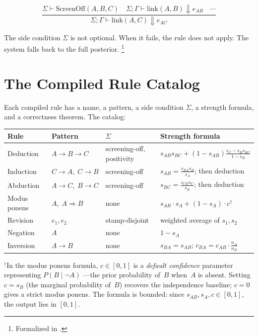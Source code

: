 \documentclass[11pt,openany]{report}
\begin{document}
\[
\frac{\Sigma \vdash \mathrm{ScreenOff}(A, B, C) \quad
      \Sigma; \Gamma \vdash \mathrm{link}(A, B) \Downarrow e_{AB}
      \quad \cdots}
     {\Sigma; \Gamma \vdash \mathrm{link}(A, C) \Downarrow e_{AC}}
\]

\noindent
The side condition $\Sigma$ is not optional.  When it fails, the
rule does not apply.  The system falls back to the full posterior.%
\footnote{Formalized in
.}

\section{The Compiled Rule Catalog}

Each compiled rule has a name, a pattern, a side condition $\Sigma$,
a strength formula, and a correctness theorem.  The catalog:

\medskip
{\footnotesize
\begin{center}
\begin{tabular}{llll}
\toprule
\textbf{Rule} & \textbf{Pattern} & \textbf{$\Sigma$}
  & \textbf{Strength formula} \\
\midrule
Deduction & $A \!\to\! B \!\to\! C$
  & screening-off, positivity
  & $s_{AB} s_{BC} + (1\!-\!s_{AB})\frac{s_C - s_B s_{BC}}{1 - s_B}$ \\[3pt]
Induction & $C \!\to\! A,\; C \!\to\! B$
  & screening-off
  & $s_{AB} \!=\! \frac{s_{BA} s_B}{s_A}$; then deduction \\[3pt]
Abduction & $A \!\to\! C,\; B \!\to\! C$
  & screening-off
  & $s_{BC} \!=\! \frac{s_{CB} s_C}{s_B}$; then deduction \\[3pt]
Modus ponens & $A,\; A \!\Rightarrow\! B$
  & none
  & $s_{AB} \cdot s_A + (1\!-\!s_A) \cdot c$\;$^{\dagger}$ \\[3pt]
Revision & $e_1, e_2$
  & stamp-disjoint
  & weighted average of $s_1, s_2$ \\[3pt]
Negation & $A$
  & none
  & $1 - s_A$ \\[3pt]
Inversion & $A \!\to\! B$
  & none
  & $s_{BA} \!=\! s_{AB}$;\; $c_{BA} \!=\! c_{AB} \!\cdot\! \tfrac{n_A}{n_B}$ \\
\bottomrule
\end{tabular}
\end{center}}
\medskip

\noindent
$^{\dagger}$In the modus ponens formula, $c \in [0, 1]$ is a
\emph{default confidence} parameter representing $P(B \mid \neg A)$
---the prior probability of~$B$ when~$A$ is absent.  Setting
$c = s_B$ (the marginal probability of~$B$) recovers the
independence baseline; $c = 0$ gives a strict modus ponens.  The
formula is bounded: since $s_{AB}, s_A, c \in [0, 1]$, the output
lies in $[0, 1]$.
\end{document}

